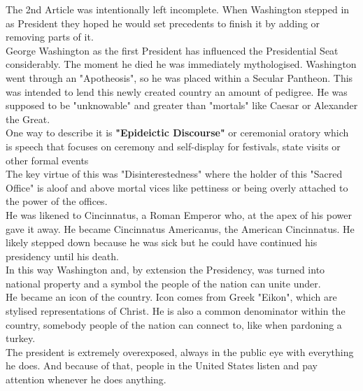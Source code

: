 \documentclass{article}
\begin{document}
	The 2nd Article was intentionally left incomplete. When Washington stepped in as President they hoped he would set precedents to finish it by adding or removing parts of it. \\
	George Washington as the first President has influenced the Presidential Seat considerably. The moment he died he was immediately mythologised. Washington went through an "Apotheosis", so he was placed within a Secular Pantheon. This was intended to lend this newly created country an amount of pedigree. He was supposed to be "unknowable" and greater than "mortals" like Caesar or Alexander the Great. \\
	One way to describe it is \textbf{"Epideictic Discourse"} or ceremonial oratory which is speech that focuses on ceremony and self-display for festivals, state visits or other formal events \\
	The key virtue of this was "Disinterestedness" where the holder of this "Sacred Office" is aloof and above mortal vices like pettiness or being overly attached to the power of the offices. \\
	He was likened to Cincinnatus, a Roman Emperor who, at the apex of his power gave it away. He became Cincinnatus Americanus, the American Cincinnatus. He likely stepped down because he was sick but he could have continued his presidency until his death. \\
	In this way Washington and, by extension the Presidency, was turned into national property and a symbol the people of the nation can unite under. \\
	He became an icon of the country. Icon comes from Greek "Eikon", which are stylised representations of Christ. He is also a common denominator within the country, somebody people of the nation can connect to, like when pardoning a turkey. \\
	The president is extremely overexposed, always in the public eye with everything he does. And because of that, people in the United States listen and pay attention whenever he does anything. \\
\end{document}
